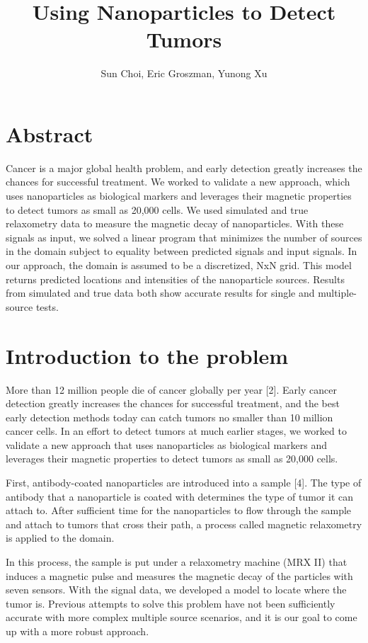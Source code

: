\documentclass[a4paper]{article}
\title{Using Nanoparticles to Detect Tumors}
\author{Sun Choi, Eric Groszman, Yunong Xu}
\begin{document}
\maketitle
\tableofcontents

\section*{Abstract}
Cancer is a major global health problem, and early detection greatly increases the chances for successful treatment. We worked to validate a new approach, which uses nanoparticles as biological markers and leverages their magnetic properties to detect tumors as small as 20,000 cells. We used simulated and true relaxometry data to measure the magnetic decay of nanoparticles. With these signals as input, we solved a linear program that minimizes the number of sources in the domain subject to equality between predicted signals and input signals. In our approach, the domain is assumed to be a discretized, NxN grid. This model returns predicted locations and intensities of the nanoparticle sources. Results from simulated and true data both show accurate results for single and multiple-source tests.

\section{Introduction to the problem}

More than 12 million people die of cancer globally per year [2]. Early cancer detection greatly increases the chances for successful treatment, and the best early detection methods today can catch tumors no smaller than 10 million cancer cells. 
In an effort to detect tumors at much earlier stages, we worked to validate a new approach that uses nanoparticles as biological markers and leverages their magnetic properties to detect tumors as small as 20,000 cells. 

First, antibody-coated nanoparticles are introduced into a sample [4]. The type of antibody that a nanoparticle is coated with determines the type of tumor it can attach to. After sufficient time for the nanoparticles to flow through the sample and attach to tumors that cross their path, a process called magnetic relaxometry is applied to the domain. 

In this process, the sample is put under a relaxometry machine (MRX II) that induces a magnetic pulse and measures the magnetic decay of the particles with seven sensors. With the signal data, we developed a model to locate where the tumor is. Previous attempts to solve this problem have not been sufficiently accurate with more complex multiple source scenarios, and it is our goal to come up with a more robust approach.
\end{document}

